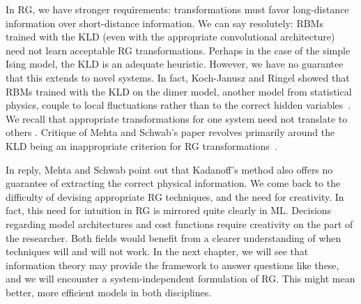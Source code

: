 In RG, we have stronger requirements: transformations must favor
long-distance information over short-distance information. We can say
resolutely: RBMs trained with the KLD (even with the appropriate
convolutional architecture) need not learn acceptable RG
transformations. Perhaps in the case of the simple Ising model, the
KLD is an adequate heuristic. However, we have no guarantee that this
extends to novel systems. In fact, Koch-Janusz and Ringel showed that
RBMs trained with the KLD on the dimer model, another model from
statistical physics, couple to local fluctuations rather than to the
correct hidden variables~\cite{kjr}. We recall that appropriate
transformations for one system need not translate to others
. Critique of Mehta and Schwab's paper revolves
primarily around the KLD being an inappropriate criterion for RG
transformations~\cite{lin, iso}.

In reply, Mehta and Schwab point out that Kadanoff's method also
offers no guarantee of extracting the correct physical information. We
come back to the difficulty of devising appropriate RG techniques, and
the need for creativity. In fact, this need for intuition in RG is
mirrored quite clearly in ML\@. Decisions regarding model
architectures and cost functions require creativity on the part of the
researcher. Both fields would benefit from a clearer understanding of
when techniques will and will not work. In the next chapter, we will
see that information theory may provide the framework to answer
questions like these, and we will encounter a system-independent
formulation of RG\@. This might mean better, more efficient models in
both disciplines.
